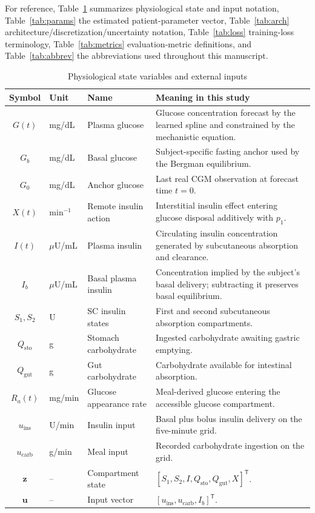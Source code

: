 \documentclass[journal]{IEEEtran}
\begin{document}
For reference, Table~\ref{tab:states} summarizes physiological state and input notation, Table~\ref{tab:params} the estimated patient-parameter vector, Table~\ref{tab:arch} architecture/discretization/uncertainty notation, Table~\ref{tab:loss} training-loss terminology, Table~\ref{tab:metrics} evaluation-metric definitions, and Table~\ref{tab:abbrev} the abbreviations used throughout this manuscript.

\begin{table}[t]
\centering
\caption{Physiological state variables and external inputs}
\label{tab:states}
\footnotesize
\begin{tabular}{clp{5cm}p{7cm}}
\toprule
Symbol & Unit & Name & Meaning in this study \\
\midrule
$G(t)$ & mg/dL & Plasma glucose & Glucose concentration forecast by the learned spline and constrained by the mechanistic equation. \\
$G_b$ & mg/dL & Basal glucose & Subject-specific fasting anchor used by the Bergman equilibrium. \\
$G_0$ & mg/dL & Anchor glucose & Last real CGM observation at forecast time $t=0$. \\
$X(t)$ & min$^{-1}$ & Remote insulin action & Interstitial insulin effect entering glucose disposal additively with $p_1$. \\
$I(t)$ & $\mu$U/mL & Plasma insulin & Circulating insulin concentration generated by subcutaneous absorption and clearance. \\
$I_b$ & $\mu$U/mL & Basal plasma insulin & Concentration implied by the subject's basal delivery; subtracting it preserves basal equilibrium. \\
$S_1, S_2$ & U & SC insulin states & First and second subcutaneous absorption compartments. \\
$Q_{\text{sto}}$ & g & Stomach carbohydrate & Ingested carbohydrate awaiting gastric emptying. \\
$Q_{\text{gut}}$ & g & Gut carbohydrate & Carbohydrate available for intestinal absorption. \\
$R_a(t)$ & mg/min & Glucose appearance rate & Meal-derived glucose entering the accessible glucose compartment. \\
$u_{\text{ins}}$ & U/min & Insulin input & Basal plus bolus insulin delivery on the five-minute grid. \\
$u_{\text{carb}}$ & g/min & Meal input & Recorded carbohydrate ingestion on the grid. \\
$\mathbf{z}$ & -- & Compartment state & ${[S_1, S_2, I, Q_{\text{sto}}, Q_{\text{gut}}, X]}^{\mathsf T}$. \\
$\mathbf{u}$ & -- & Input vector & ${[u_{\text{ins}}, u_{\text{carb}}, I_b]}^{\mathsf T}$. \\
\bottomrule
\end{tabular}
\end{table}
\end{document}
